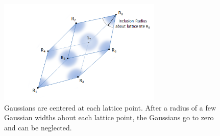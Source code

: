 \documentclass[double,12pt]{beavtex}
\begin{document}

\begin{figure}
   \centering
   \includegraphics[height=5cm]{InclusionRadius.png}
   \caption{Gaussians are centered at each lattice point. After a radius 
   of a few Gaussian widths about each lattice point, the Gaussians go to 
   zero and can be neglected.}
   \label{fig:InclusionRadius}
\end{figure} 
\end{document}

